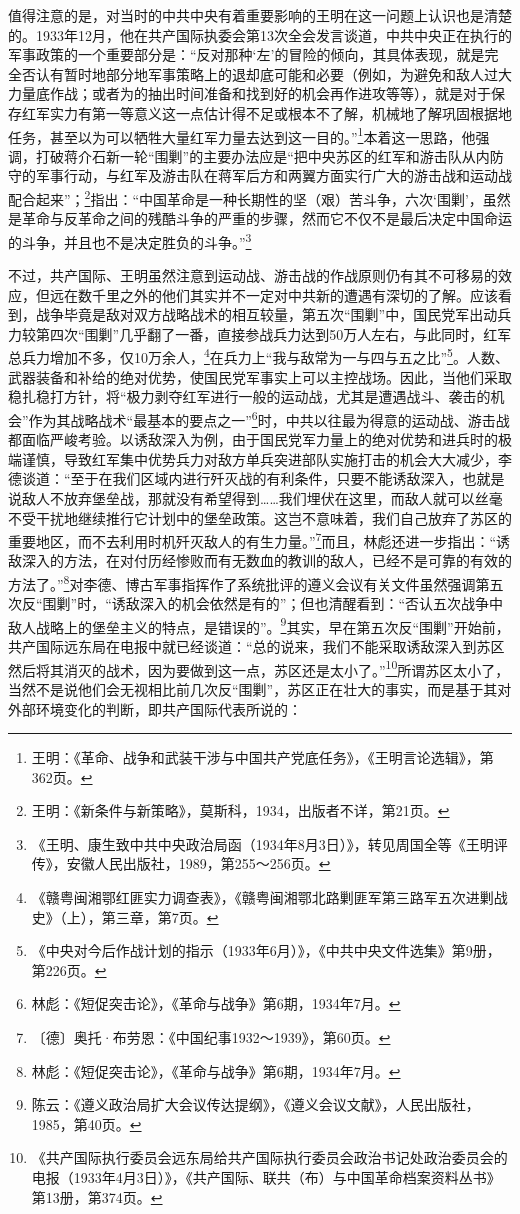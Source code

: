 值得注意的是，对当时的中共中央有着重要影响的王明在这一问题上认识也是清楚的。1933年12月，他在共产国际执委会第13次全会发言谈道，中共中央正在执行的军事政策的一个重要部分是：“反对那种‘左’的冒险的倾向，其具体表现，就是完全否认有暂时地部分地军事策略上的退却底可能和必要（例如，为避免和敌人过大力量底作战；或者为的抽出时间准备和找到好的机会再作进攻等等），就是对于保存红军实力有第一等意义这一点估计得不足或根本不了解，机械地了解巩固根据地任务，甚至以为可以牺牲大量红军力量去达到这一目的。”\footnote{王明：《革命、战争和武装干涉与中国共产党底任务》，《王明言论选辑》，第362页。}本着这一思路，他强调，打破蒋介石新一轮“围剿”的主要办法应是“把中央苏区的红军和游击队从内防守的军事行动，与红军及游击队在蒋军后方和两翼方面实行广大的游击战和运动战配合起来”；\footnote{王明：《新条件与新策略》，莫斯科，1934，出版者不详，第21页。}指出：“中国革命是一种长期性的坚（艰）苦斗争，六次‘围剿’，虽然是革命与反革命之间的残酷斗争的严重的步骤，然而它不仅不是最后决定中国命运的斗争，并且也不是决定胜负的斗争。”\footnote{《王明、康生致中共中央政治局函（1934年8月3日）》，转见周国全等《王明评传》，安徽人民出版社，1989，第255～256页。}


不过，共产国际、王明虽然注意到运动战、游击战的作战原则仍有其不可移易的效应，但远在数千里之外的他们其实并不一定对中共新的遭遇有深切的了解。应该看到，战争毕竟是敌对双方战略战术的相互较量，第五次“围剿”中，国民党军出动兵力较第四次“围剿”几乎翻了一番，直接参战兵力达到50万人左右，与此同时，红军总兵力增加不多，仅10万余人，\footnote{《赣粤闽湘鄂红匪实力调查表》，《赣粤闽湘鄂北路剿匪军第三路军五次进剿战史》（上），第三章，第7页。}在兵力上“我与敌常为一与四与五之比”\footnote{《中央对今后作战计划的指示（1933年6月）》，《中共中央文件选集》第9册，第226页。}。人数、武器装备和补给的绝对优势，使国民党军事实上可以主控战场。因此，当他们采取稳扎稳打方针，将“极力剥夺红军进行一般的运动战，尤其是遭遇战斗、袭击的机会”作为其战略战术“最基本的要点之一”\footnote{林彪：《短促突击论》，《革命与战争》第6期，1934年7月。}时，中共以往最为得意的运动战、游击战都面临严峻考验。以诱敌深入为例，由于国民党军力量上的绝对优势和进兵时的极端谨慎，导致红军集中优势兵力对敌方单兵突进部队实施打击的机会大大减少，李德谈道：“至于在我们区域内进行歼灭战的有利条件，只要不能诱敌深入，也就是说敌人不放弃堡垒战，那就没有希望得到……我们埋伏在这里，而敌人就可以丝毫不受干扰地继续推行它计划中的堡垒政策。这岂不意味着，我们自己放弃了苏区的重要地区，而不去利用时机歼灭敌人的有生力量。”\footnote{〔德〕奥托·布劳恩：《中国纪事1932～1939》，第60页。}而且，林彪还进一步指出：“诱敌深入的方法，在对付历经惨败而有无数血的教训的敌人，已经不是可靠的有效的方法了。”\footnote{林彪：《短促突击论》，《革命与战争》第6期，1934年7月。}对李德、博古军事指挥作了系统批评的遵义会议有关文件虽然强调第五次反“围剿”时，“诱敌深入的机会依然是有的”；但也清醒看到：“否认五次战争中敌人战略上的堡垒主义的特点，是错误的”。\footnote{陈云：《遵义政治局扩大会议传达提纲》，《遵义会议文献》，人民出版社，1985，第40页。}其实，早在第五次反“围剿”开始前，共产国际远东局在电报中就已经谈道：“总的说来，我们不能采取诱敌深入到苏区然后将其消灭的战术，因为要做到这一点，苏区还是太小了。”\footnote{《共产国际执行委员会远东局给共产国际执行委员会政治书记处政治委员会的电报（1933年4月3日）》，《共产国际、联共（布）与中国革命档案资料丛书》第13册，第374页。}所谓苏区太小了，当然不是说他们会无视相比前几次反“围剿”，苏区正在壮大的事实，而是基于其对外部环境变化的判断，即共产国际代表所说的：

